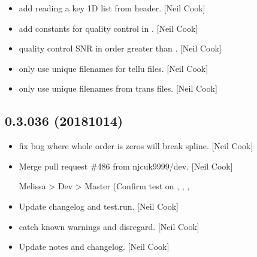 \documentclass[a4paper,10pt,english]{report}
\begin{document}
\begin{itemize}
\item {} 
 \sphinxhyphen{} add reading a key 1D list from header. {[}Neil Cook{]}

\item {} 
 \sphinxhyphen{} add constants for quality control in
. {[}Neil Cook{]}

\item {} 
 \sphinxhyphen{} quality control SNR in order 
greater than . {[}Neil Cook{]}

\item {} 
 \sphinxhyphen{} only use unique filenames for tellu files. {[}Neil
Cook{]}

\item {} 
 \sphinxhyphen{} only use unique filenames from trans files. {[}Neil
Cook{]}

\end{itemize}


\subsection{0.3.036 (2018\sphinxhyphen{}10\sphinxhyphen{}14)}
\label{\detokenize{misc/changelog:id314}}\begin{itemize}
\item {} 
  \sphinxhyphen{} fix bug where whole order is zeros \sphinxhyphen{} will break
spline. {[}Neil Cook{]}

\item {} 
Merge pull request \#486 from njcuk9999/dev. {[}Neil Cook{]}

Melissa \textendash{}\textgreater{} Dev \textendash{}\textgreater{} Master (Confirm test on , , , 

\item {} 
Update changelog and test.run. {[}Neil Cook{]}

\item {} 
 \sphinxhyphen{} catch known warnings and disregard. {[}Neil Cook{]}

\item {} 
Update notes and changelog. {[}Neil Cook{]}

\end{itemize}
\end{document}

